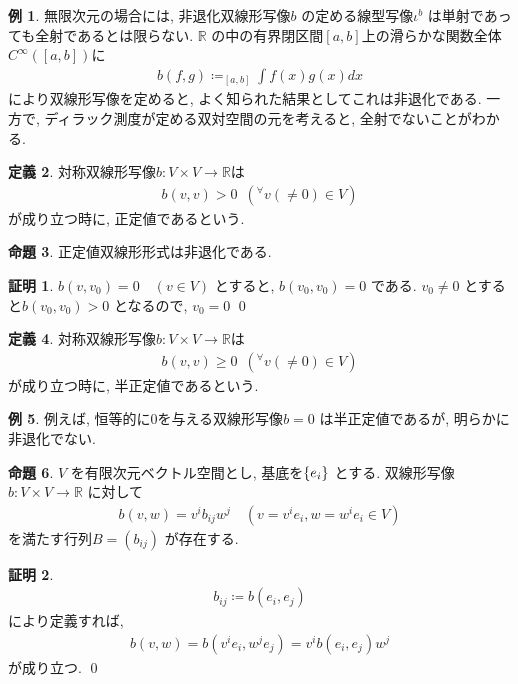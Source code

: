 \documentclass[10pt, fleqn, label-section=none]{bxjsarticle}
\theoremstyle{definition}
\newtheorem{dfn}{定義}[section]
\newtheorem{ex}[dfn]{例}
\newtheorem{prop}[dfn]{命題}
\newtheorem*{pf*}{証明}
\newcommand{\any}{{}^{\forall}}
\newcommand{\cbra}[1]{\mleft\{#1\mright\}}
\renewcommand{\;}{\, ; \,}
\begin{document}
\begin{ex}
無限次元の場合には, 非退化双線形写像$b$ の定める線型写像$\iota^b $ は単射であっても全射であるとは限らない. $\mathbb R$ の中の有界閉区間$[a,b]$上の滑らかな関数全体$C^\infty ([a,b])$に
\begin{align*} b(f, g) \coloneqq_{[a,b]} \int f(x) g(x) dx \end{align*}
により双線形写像を定めると, よく知られた結果としてこれは非退化である. 一方で, ディラック測度が定める双対空間の元を考えると, 全射でないことがわかる. 
\end{ex}


\begin{dfn}
対称双線形写像$b: V \times V \rightarrow \mathbb R$は
\begin{align*} b(v,v) > 0 \,\,\, (\any v (\neq 0)\in V )\end{align*}
が成り立つ時に, 正定値であるという. 
\end{dfn}

\begin{prop}
正定値双線形形式は非退化である. 
\end{prop}
\begin{pf*}
$b(v, v_0) = 0\quad (v \in V)$ とすると, $b(v_0, v_0) = 0$ である. $v_0 \neq 0 $ とすると$b(v_0, v_0) > 0$ となるので, $v_0 = 0$
\qed
\end{pf*}

\begin{dfn}
対称双線形写像$b: V \times V \rightarrow \mathbb R$は
\begin{align*} b(v,v) \geq 0 \,\,\, (\any v (\neq 0)\in V )\end{align*}
が成り立つ時に, 半正定値であるという. 
\end{dfn}

\begin{ex}
例えば, 恒等的に$0$を与える双線形写像$b = 0$ は半正定値であるが, 明らかに非退化でない. 
\end{ex}

\begin{prop}$V$ を有限次元ベクトル空間とし, 基底を$\cbra{e_i}$ とする. 双線形写像$b: V \times V \rightarrow \mathbb R$ に対して
\begin{align*} b(v, w) = v^i b_{ij} w^j \quad (v = v^i e_i, w = w^i e_i \in V)\end{align*}
を満たす行列$B = (b_{ij})$ が存在する. 
\end{prop}
\begin{pf*}
\begin{align*} b_{ij} \coloneqq b(e_i, e_j)\end{align*}
により定義すれば, 
\begin{align*} b(v,w) = b(v^ie_i, w^je_j) = v^i b(e_i, e_j) w^j \end{align*}
が成り立つ. 
\qed
\end{pf*}
\end{document}
